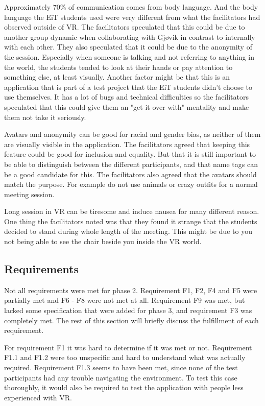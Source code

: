         Approximately 70\% of communication comes from body language. And the body language the EiT students used were very different from what the facilitators had observed outside of VR. The facilitators speculated that this could be due to another group dynamic when collaborating with Gjøvik in contrast to internally with each other. They also speculated that it could be due to the anonymity of the session. Especially when someone is talking and not referring to anything in the world, the students tended to look at their hands or pay attention to something else, at least visually. Another factor might be that this is an application that is part of a test project that the EiT students didn't choose to use themselves. It has a lot of bugs and technical difficulties so the facilitators speculated that this could give them an "get it over with" mentality and make them not take it seriously.
        
        Avatars and anonymity can be good for racial and gender bias, as neither of them are visually visible in the application. The facilitators agreed that keeping this feature could be good for inclusion and equality. But that it is still important to be able to distinguish between the different participants, and that name tags can be a good candidate for this. The facilitators also agreed that the avatars should match the purpose. For example do not use animals or crazy outfits for a normal meeting session.
        
        Long session in VR can be tiresome and induce nausea for many different reason. One thing the facilitators noted was that they found it strange that the students decided to stand during whole length of the meeting. This might be due to you not being able to see the chair beside you inside the VR world.
        
        \subsection{Requirements} %
        Not all requirements were met for phase 2. Requirement F1, F2, F4 and F5 were partially met and F6 - F8 were not met at all. Requirement F9 was met, but lacked some specification that were added for phase 3, and requirement F3 was completely met. The rest of this section will briefly discuss the fulfillment of each requirement.
        
        For requirement F1 it was hard to determine if it was met or not. Requirement F1.1 and F1.2 were too unspecific and hard to understand what was actually required. Requirement F1.3 seems to have been met, since none of the test participants had any trouble navigating the environment. To test this case thoroughly, it would also be required to test the application with people less experienced with VR.
        
